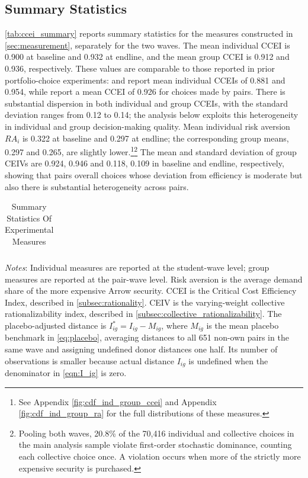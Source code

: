 \documentclass[11 pt]{article}
\begin{document}
\subsection{Summary Statistics}
\autoref{tab:ccei_summary} reports summary statistics for the measures constructed in \autoref{sec:measurement}, separately for the two waves. The mean individual CCEI is 0.900 at baseline and 0.932 at endline, and the mean group CCEI is 0.912 and 0.936, respectively. These values are comparable to those reported in prior portfolio-choice experiments: \citet{Choietal:2007:AER} and \citet{Choietal:2014:AER} report mean individual CCEIs of 0.881 and 0.954, while \citet{GonzalezJimenezMueller2025SSRN} report a mean CCEI of 0.926 for choices made by pairs. There is substantial dispersion in both individual and group CCEIs, with the standard deviation ranges from 0.12 to 0.14; the analysis below exploits this heterogeneity in individual and group decision-making quality. Mean individual risk aversion $RA_{i}$ is 0.322 at baseline and 0.297 at endline; the corresponding group means, 0.297 and 0.265, are slightly lower.\footnote{See Appendix \autoref{fig:cdf_ind_group_ccei} and Appendix \autoref{fig:cdf_ind_group_ra} for the full distributions of these measures.}\footnote{Pooling both waves, 20.8\% of the 70,416 individual and collective choices in the main analysis sample violate first-order stochastic dominance, counting each collective choice once. A violation occurs when more of the strictly more expensive security is purchased.} The mean and standard deviation of group CEIVs are 0.924, 0.946 and 0.118, 0.109 in baseline and endline, respectively, showing that pairs overall choices whose deviation from efficiency is moderate but also there is substantial heterogeneity across pairs.

\begin{table}[h]
\centering
\caption{Summary Statistics Of Experimental Measures}
\label{tab:ccei_summary}
\begin{tabular}{lcccccc}
\toprule \hline

\end{tabular}
\begin{minipage}{\textwidth}
{\footnotesize \emph{Notes}: Individual measures are reported at the student-wave level; group measures are reported at the pair-wave level. Risk aversion is the average demand share of the more expensive Arrow security. CCEI is the Critical Cost Efficiency Index, described in \autoref{subsec:rationality}. CEIV is the varying-weight collective rationalizability index, described in \autoref{subsec:collective_rationalizability}. The placebo-adjusted distance is $I^*_{ig}=I_{ig}-M_{ig}$, where $M_{ig}$ is the mean placebo benchmark in \autoref{eq:placebo}, averaging distances to all 651 non-own pairs in the same wave and assigning undefined donor distances one half. Its number of observations is smaller because actual distance $I_{ig}$ is undefined when the denominator in \autoref{eqn:I_ig} is zero.}
\end{minipage}
\end{table}
\end{document}
